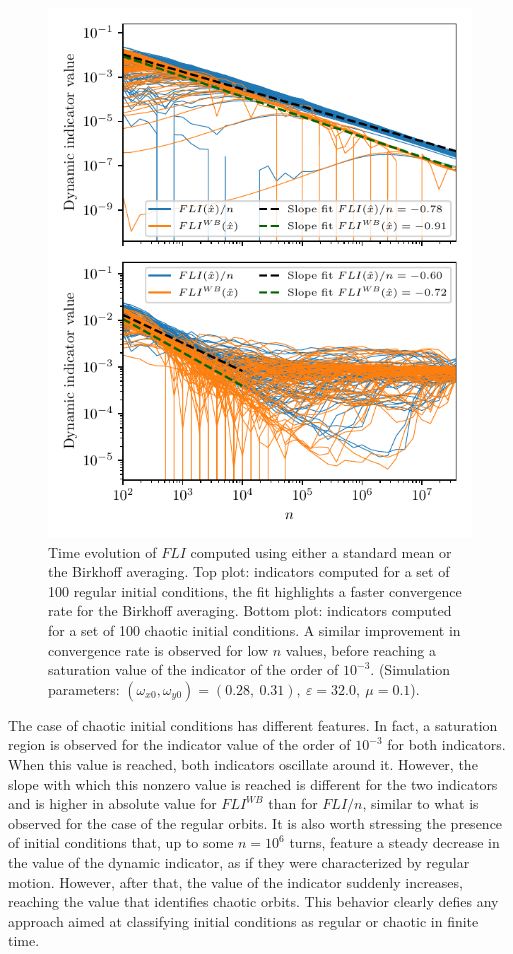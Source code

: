 \begin{figure}[htp]
    \centering
    \includegraphics[width=\columnwidth]{6_dynamic_indicators/figs/lyap_birkhoff.pdf}
    \caption{Time evolution of $FLI$ computed using either a standard mean or the Birkhoff averaging. Top plot: indicators computed for a set of 100 regular initial conditions, the fit highlights a faster convergence rate for the Birkhoff averaging. Bottom plot: indicators computed for a set of 100 chaotic initial conditions. A similar improvement in convergence rate is observed for low $n$ values, before reaching a saturation value of the indicator of the order of $10^{-3}$. (Simulation parameters: $(\omega_{x0},\omega_{y0})= (0.28,\ 0.31),\ \varepsilon=32.0,\ \mu=0.1$).}
    \label{fig:fli_compare_mean_birk}
\end{figure}

The case of chaotic initial conditions has different features. In fact, a saturation region is observed for the indicator value of the order of $10^{-3}$ for both indicators. When this value is reached, both indicators oscillate around it. However, the slope with which this nonzero value is reached is different for the two indicators and is higher in absolute value for $FLI^{WB}$ than for $FLI/n$, similar to what is observed for the case of the regular orbits. It is also worth stressing the presence of initial conditions that, up to some $n=10^6$ turns, feature a steady decrease in the value of the dynamic indicator, as if they were characterized by regular motion. However, after that, the value of the indicator suddenly increases, reaching the value that identifies chaotic orbits. This behavior clearly defies any approach aimed at classifying initial conditions as regular or chaotic in finite time. 

